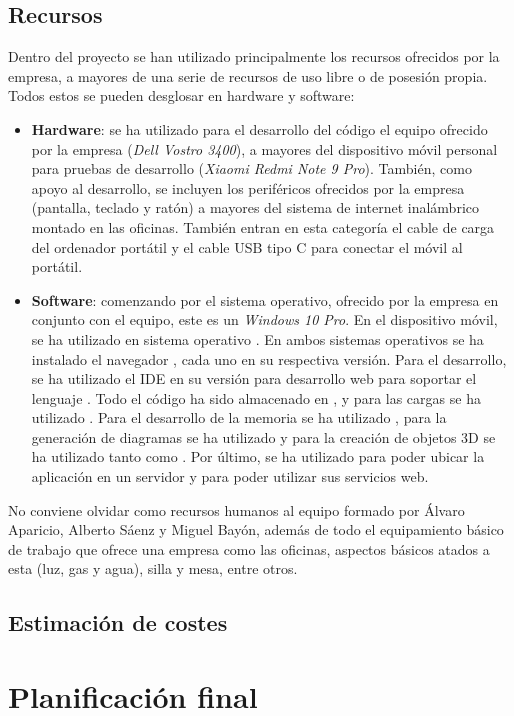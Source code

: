 \documentclass{subfiles}
\begin{document}

        \subsection{Recursos}
        \label{sec:recursos}

        Dentro del proyecto se han utilizado principalmente los recursos ofrecidos por la empresa, a mayores de una serie de recursos de uso libre o de posesión propia. Todos estos se pueden desglosar en hardware y software:

        \begin{itemize}
            \item \textbf{Hardware}: se ha utilizado para el desarrollo del código el equipo ofrecido por la empresa (\textit{Dell Vostro 3400}), a mayores del dispositivo móvil personal para pruebas de desarrollo (\textit{Xiaomi Redmi Note 9 Pro}). También, como apoyo al desarrollo, se incluyen los periféricos ofrecidos por la empresa (pantalla, teclado y ratón) a mayores del sistema de internet inalámbrico montado en las oficinas. También entran en esta categoría el cable de carga del ordenador portátil y el cable USB tipo C para conectar el móvil al portátil.
            \item \textbf{Software}: comenzando por el sistema operativo, ofrecido por la empresa en conjunto con el equipo, este es un \textit{Windows 10 Pro}. En el dispositivo móvil, se ha utilizado en sistema operativo \android. En ambos sistemas operativos se ha instalado el navegador \googlechrome, cada uno en su respectiva versión. Para el desarrollo, se ha utilizado el IDE \eclipse en su versión para desarrollo web para soportar el lenguaje \js. Todo el código ha sido almacenado en \github, y para las cargas se ha utilizado \gitkraken. Para el desarrollo de la memoria se ha utilizado \overleaf, para la generación de diagramas se ha utilizado \drawio y para la creación de objetos 3D se ha utilizado tanto \blender como \makehuman. Por último, se ha utilizado \aws para poder ubicar la aplicación en un servidor y para poder utilizar sus servicios web.
        \end{itemize}

        No conviene olvidar como recursos humanos al equipo formado por Álvaro Aparicio, Alberto Sáenz y Miguel Bayón, además de todo el equipamiento básico de trabajo que ofrece una empresa como las oficinas, aspectos básicos atados a esta (luz, gas y agua), silla y mesa, entre otros.

        \subsection{Estimación de costes}
        \label{sec:estimacion_de_costes}

        \section{Planificación final}
        \label{sec:planificacion_final}
\end{document}
